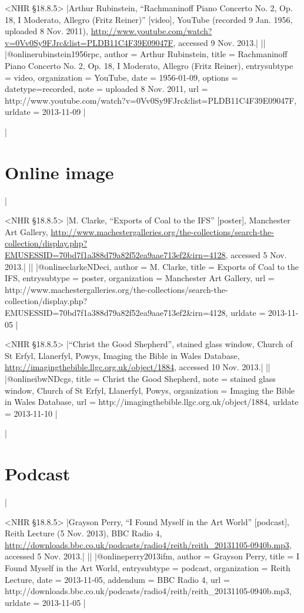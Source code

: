 \documentclass[extrafontsizes,11pt,a4paper,oneside]{memoir}
\begin{document}
\bibexample<NHR \S18.8.5>
|Arthur Rubinstein, \enquote{Rachmaninoff Piano Concerto No. 2, Op. 18, I Moderato, Allegro (Fritz Reiner)} [video], YouTube (recorded 9 Jan. 1956, uploaded 8 Nov. 2011), \url{http://www.youtube.com/watch?v=0Vv0Sy9FJrc&list=PLDB11C4F39E09047F}, accessed 9 Nov. 2013.|%
||%
|@online{rubinstein1956rpc,
  author = {Arthur Rubinstein},
  title = {Rachmaninoff Piano Concerto No. 2, Op. 18, I Moderato, Allegro (Fritz Reiner)},
  entrysubtype = {video},
  organization = {YouTube},
  date = {1956-01-09},
  options = {datetype={recorded}},
  note = {uploaded 8 Nov. 2011},
  url = {http://www.youtube.com/watch?v=0Vv0Sy9FJrc&list=PLDB11C4F39E09047F},
  urldate = {2013-11-09}
}|

\todoc|
\section{Online image}
|

\bibexample<NHR \S18.8.5>
|M. Clarke, \enquote{Exports of Coal to the IFS} [poster], Manchester Art Gallery, \url{http://www.machestergalleries.org/the-collections/search-the-collection/display.php?EMUSESSID=70bd7f1a388d79a82f52ea9aae713ef2&irn=4128}, accessed 5 Nov. 2013.|%
||%
|@online{clarkeNDeci,
  author = {M. Clarke},
  title = {Exports of Coal to the IFS},
  entrysubtype = {poster},
  organization = {Manchester Art Gallery},
  url = {http://www.machestergalleries.org/the-collections/search-the-collection/display.php?EMUSESSID=70bd7f1a388d79a82f52ea9aae713ef2&irn=4128},
  urldate = {2013-11-05}
}|

\bibexample<NHR \S18.8.5>
|\enquote{Christ the Good Shepherd}, stained glass window, Church of St Erfyl, Llanerfyl, Powys, Imaging the Bible in Wales Database, \url{http://imagingthebible.llgc.org.uk/object/1884}, accessed 10 Nov. 2013.|%
||%
|@online{ibwNDcgs,
  title = {Christ the Good Shepherd},
  note = {stained glass window, Church of St Erfyl, Llanerfyl, Powys},
  organization = {Imaging the Bible in Wales Database},
  url = {http://imagingthebible.llgc.org.uk/object/1884},
  urldate = {2013-11-10}
}|

\todoc|
\section{Podcast}
|

\bibexample<NHR \S18.8.5>
|Grayson Perry, \enquote{I Found Myself in the Art World} [podcast], Reith Lecture (5 Nov. 2013), BBC Radio 4, \url{http://downloads.bbc.co.uk/podcasts/radio4/reith/reith_20131105-0940b.mp3}, accessed 5 Nov. 2013.|%
||%
|@online{perry2013ifm,
  author = {Grayson Perry},
  title = {I Found Myself in the Art World},
  entrysubtype = {podcast},
  organization = {Reith Lecture},
  date = {2013-11-05},
  addendum = {BBC Radio 4},
  url = {http://downloads.bbc.co.uk/podcasts/radio4/reith/reith_20131105-0940b.mp3},
  urldate = {2013-11-05}
}|
\end{document}

